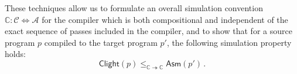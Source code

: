 \documentclass[sigplan,10pt,review,anonymous]{acmart}
\newcommand{\kw}[1]{\ensuremath{ \mathsf{#1} }}
\begin{document}
These techniques allow us to formulate an overall
simulation convention
$\mathbb{C} : \mathcal{C} \Leftrightarrow \mathcal{A}$
for the compiler which is both compositional
and independent of the exact sequence of passes
included in the compiler,
and to show that for a source program $p$
compiled to the target program $p'$,
the following simulation property holds:
\[
    \kw{Clight}(p)
    \le_{\mathbb{C} \twoheadrightarrow \mathbb{C}}
    \kw{Asm}(p') \,.
\]



\end{document}
